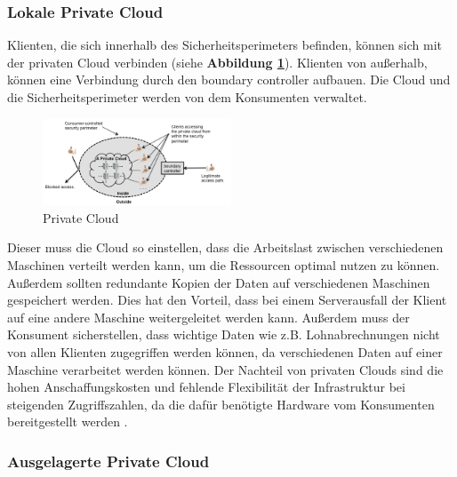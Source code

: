 \subsubsection{Lokale Private Cloud}
Klienten, die sich innerhalb des Sicherheitsperimeters befinden, können sich mit der privaten Cloud verbinden (siehe \textbf{Abbildung \ref{PrivateCloud}}). 
Klienten von außerhalb, können eine Verbindung durch den \glqq boundary controller\grqq{} aufbauen. Die Cloud und die Sicherheitsperimeter werden von dem Konsumenten verwaltet.
\begin{figure}[h]
    \centering
	\includegraphics[width=0.5\textwidth]{Images/On-sitePrivateCloud}
	\caption{Private Cloud \cite{Badger}}
	\label{PrivateCloud}
\end{figure}
Dieser muss die Cloud so einstellen, dass die Arbeitslast zwischen verschiedenen Maschinen verteilt werden kann, um die Ressourcen optimal nutzen zu können. Außerdem sollten redundante Kopien der Daten auf verschiedenen Maschinen 
gespeichert werden. Dies hat den Vorteil, dass bei einem Serverausfall der Klient auf eine andere Maschine weitergeleitet werden kann.
Außerdem muss der Konsument sicherstellen, dass wichtige Daten wie z.B. Lohnabrechnungen nicht von allen Klienten zugegriffen werden können,
da verschiedenen Daten auf einer Maschine verarbeitet werden können. Der Nachteil von privaten Clouds sind die hohen Anschaffungskosten und fehlende Flexibilität der Infrastruktur bei steigenden Zugriffszahlen, da die dafür benötigte Hardware vom Konsumenten bereitgestellt werden \cite{Badger}.

\subsubsection{Ausgelagerte Private Cloud}

